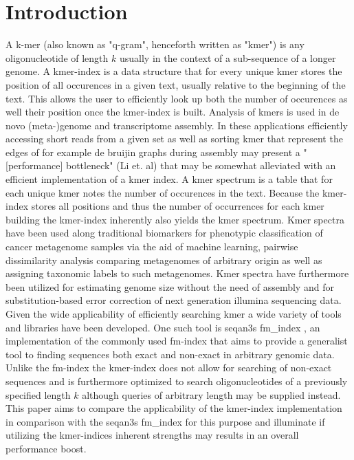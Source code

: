 \chapter{Introduction}
A k-mer (also known as "q-gram", henceforth written as "kmer") is any oligonucleotide of length $k$ usually in the
context of a sub-sequence of a longer genome. A kmer-index is a data structure that for every unique kmer
stores the position of all occurences in a given text, usually relative to the beginning of the text.
This allows the user to efficiently look up both the number of occurences as well their position once the kmer-index is built.
Analysis of kmers is used in de novo (meta-)genome\cite{megahit} and transcriptome\cite{SOAPdenovo-Trans} assembly.
In these applications efficiently accessing short reads from a given set as well as sorting kmer that represent
the edges of for example de bruijin graphs during assembly may present a
"[performance] bottleneck" (Li et. al) that may be somewhat alleviated with an efficient implementation of a kmer index.
A kmer spectrum is a table that for each unique kmer notes the number of occurences in the text. Because the kmer-index
stores all positions and thus the number of occurrences for each kmer building the kmer-index inherently also yields
the kmer spectrum. Kmer spectra have been used along traditional biomarkers for phenotypic classification of cancer
metagenome samples via the aid of machine learning\cite{phenotype:classification:with:kmer:spectrum}, pairwise dissimilarity
analysis comparing metagenomes of arbitrary origin\cite{kmer:spectrum:dissimilarity} as well as assigning taxonomic labels
to such metagenomes\cite{kraken:metagenome:classification}. Kmer spectra have furthermore been utilized for estimating genome
size without the need of assembly\cite{genome:size:estimation} and for substitution-based error correction
of next generation illumina sequencing data\cite{musket:kmer:spectrum:error:correction}.
\newline
Given the wide applicability of efficiently searching kmer a wide variety of tools and libraries have been developed.
One such tool is seqan3s fm\_index \cite{fm:index:master:thesis}, an implementation of the commonly used
fm-index that aims to provide a generalist tool to finding sequences both exact and non-exact in arbitrary genomic data.
Unlike the fm-index the kmer-index does not allow for searching of non-exact sequences and is furthermore optimized to
search oligonucleotides of a previously specified length $k$ although queries of arbitrary length may be supplied instead.
This paper aims to compare the applicability of the kmer-index implementation in comparison with the seqan3s fm\_index
for this purpose and illuminate if utilizing the kmer-indices inherent strengths may results in an overall performance
boost.